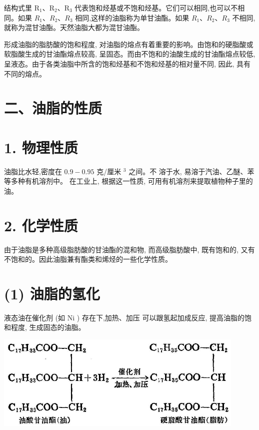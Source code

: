 \documentclass[10pt]{article}
\begin{document}
结构式里 \({\mathrm{R}}_{1}\text{、}{\mathrm{R}}_{2}\text{、}{\mathrm{R}}_{3}\) 代表饱和烃基或不饱和烃基。它们可以相同,也可以不相同。如果 \({R}_{1}\text{、}{R}_{2}\text{、}{R}_{3}\) 相同,这样的油脂称为单甘油酯。如果 \({R}_{1}\text{、}{R}_{2}\text{、}{R}_{3}\) 不相同,就称为混甘油酯。天然油脂大都为混甘油酯。

形成油脂的脂肪酸的饱和程度, 对油脂的熔点有着重要的影响。由饱和的硬脂酸或软脂酸生成的甘油酯熔点较高, 呈固态。而由不饱和的油酸生成的甘油酯熔点较低, 呈液态。由于各类油脂中所含的饱和烃基和不饱和烃基的相对量不同, 因此, 具有不同的熔点。

\section*{二、油脂的性质}

\section*{1. 物理性质}

油脂比水轻,密度在 \({0.9} - {0.95}\) 克/厘米 \({}^{3}\) 之间。不 溶于水, 易溶于汽油、乙醚、苯等多种有机溶剂中。 在工业上, 根据这一性质, 可用有机溶剂来提取植物种子里的油。

\section*{2. 化学性质}

由于油脂是多种高级脂肪酸的甘油酯的混和物, 而高级脂肪酸中, 既有饱和的, 又有不饱和的。因此油脂兼有酯类和烯烃的一些化学性质。

\section*{(1) 油脂的氢化}

液态油在催化剂 (如 \(\mathrm{{Ni}}\) ) 存在下,加热、加压 可以跟氢起加成反应, 提高油脂的饱和程度, 生成固态的油脂。

\begin{center}
\includegraphics[max width=0.9\textwidth]{images/01912d16-be99-77bb-9535-4f3ed8d9946f_144_112941.jpg}
\end{center}
\end{document}
